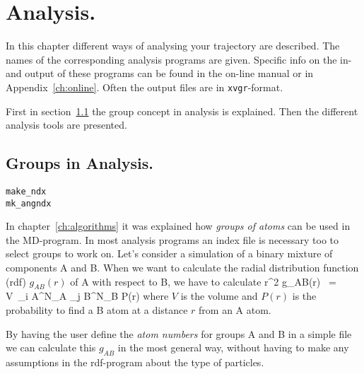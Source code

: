 \chapter{Analysis.}
\label{ch:analysis}
In this chapter different ways of analysing your trajectory are described. 
The names of the corresponding analysis programs are given. 
Specific info on the in- and output of these programs can be found 
in the on-line manual or in Appendix~\ref{ch:online}. 
Often the output files are in {\tt xvgr}-format.

First in section~\ref{sec:groups} the group concept in analysis is explained. 
Then the different analysis tools are presented.
%
%
\section{Groups in Analysis.}
\label{sec:groups}
\begin{verbatim}
make_ndx
mk_angndx
\end{verbatim}
In chapter~\ref{ch:algorithms} it was explained how {\em groups of atoms} can 
be used in the MD-program. 
In most analysis programs an index file is necessary too to select groups to
work on. Let's consider a simulation of a binary mixture of components A and
B. When we want to calculate the radial distribution function (rdf) 
$g_{AB}(r)$ of A with respect to B, we have to calculate
\pi r^2 g_{AB}(r)	~=~	V~\sum_{i \in A}^{N_A} \sum_{j \in B}^{N_B} P(r)
\eeq
where $V$ is the volume and $P(r)$ is the probability to find a B atom
at a distance $r$ from an A atom.

By having the user define the {\em atom numbers} for groups A and B in
a simple file we can calculate this $g_{AB}$ in the most general way, without
having to make any assumptions in the rdf-program about the type of 
particles. 

